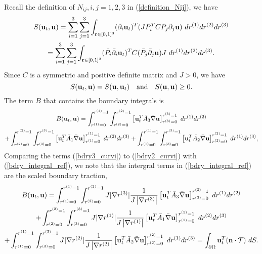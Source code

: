 Recall the definition of $N_{ij}, i,j = 1,2,3$ in (\ref{definition_Nij}), we have
\begin{multline*}
S({\bf u}_t,{\bf u}) = \sum_{i=1}^3\sum_{j=1}^3 \int_{{\bf r}\in[0,1]^3} (\bar{\partial}_i {\bf u}_t)^T(J\bar{P}_i^TC\bar{P}_j\bar{\partial}_j {\bf u})\ dr^{(1)}dr^{(2)}dr^{(3)} \\
= \sum_{i=1}^3\sum_{j=1}^3 \int_{{\bf r}\in[0,1]^3} (\bar{P}_i\bar{\partial}_i {\bf u}_t)^TC(\bar{P}_j\bar{\partial}_j {\bf u}) J\ dr^{(1)}dr^{(2)}dr^{(3)}.
\end{multline*}
Since $C$ is a symmetric and positive definite matrix and $J > 0$, we have 
\begin{equation*}
S({\bf u}_t,{\bf u}) = S({\bf u},{\bf u}_t) \ \ \  \text{and} \ \ \ S({\bf u},{\bf u}) \geq 0.
\end{equation*}
The term $B$ that contains the boundary integrals is
\begin{multline}\label{bdry_integral_ref}
B({\bf u}_t,{\bf u}) = \int_{r^{(1)} = 0}^{r^{(1)} = 1} \int_{r^{(2)} = 0}^{r^{(2)} = 1}  \left[{\bf u}_t^T\bar{A}_3\bar{\nabla} {\bf u}\right]_{r^{(3)}=0}^{r^{(3)}=1} \ dr^{(1)}dr^{(2)}\\
+ \int_{r^{(2)} = 0}^{r^{(2)} = 1} \int_{r^{(3)} = 0}^{r^{(3)} = 1}  \left[{\bf u}_t^T\bar{A}_1\bar{\nabla} {\bf u}\right]_{r^{(1)}=0}^{r^{(1)}=1}\ dr^{(2)}dr^{(3)} +\int_{r^{(1)} = 0}^{r^{(1)} = 1} \int_{r^{(3)} = 0}^{r^{(3)} = 1}  \left[{\bf u}_t^T\bar{A}_2\bar{\nabla} {\bf u}\right]_{r^{(2)}=0}^{r^{(2)}=1} \ dr^{(1)}dr^{(3)},
\end{multline}
Comparing the terms (\ref{bdry3_curvi}) to (\ref{bdry2_curvi}) with (\ref{bdry_integral_ref}), we note that the intergral terms in (\ref{bdry_integral_ref}) are the scaled boundary traction,
\begin{multline}\label{bdry_integral_curvi}
B({\bf u}_t,{\bf u}) = \int_{r^{(1)} = 0}^{r^{(1)} = 1} \int_{r^{(2)} = 0}^{r^{(2)} = 1} J|\nabla r^{(3)}|\frac{1}{J\left|\nabla r^{(3)}\right|} \left[{\bf u}_t^T\bar{A}_3\bar{\nabla} {\bf u}\right]_{r^{(3)}=0}^{r^{(3)}=1} \ dr^{(1)}dr^{(2)}\\
+ \int_{r^{(2)} = 0}^{r^{(2)} = 1} \int_{r^{(3)} = 0}^{r^{(3)} = 1} J|\nabla r^{(1)}|\frac{1}{J\left|\nabla r^{(1)}\right|}  \left[{\bf u}_t^T\bar{A}_1\bar{\nabla} {\bf u}\right]_{r^{(1)}=0}^{r^{(1)}=1}\ dr^{(2)}dr^{(3)} \\
+\int_{r^{(1)} = 0}^{r^{(1)} = 1} \int_{r^{(3)} = 0}^{r^{(3)} = 1} J|\nabla r^{(2)}|\frac{1}{J\left|\nabla r^{(2)}\right|}  \left[{\bf u}_t^T\bar{A}_2\bar{\nabla} {\bf u}\right]_{r^{(2)}=0}^{r^{(2)}=1} \ dr^{(1)}dr^{(3)} = \int_{\partial \Omega} {\bf u}_t^T({\bf n}\cdot\mathcal{T})\ dS.
\end{multline}
